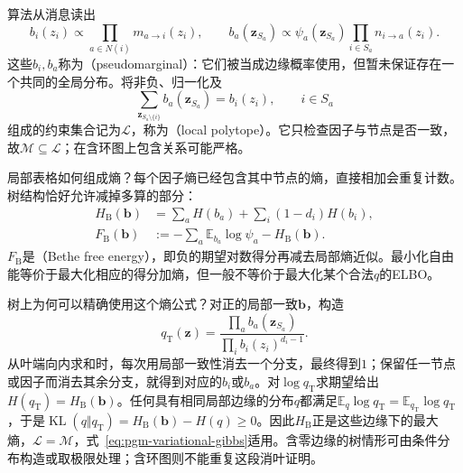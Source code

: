 算法从消息读出
\[
  b_i(z_i)\propto\prod_{a\in N(i)}m_{a\to i}(z_i),
  \qquad
  b_a(\bm z_{S_a})\propto\psi_a(\bm z_{S_a})
                         \prod_{i\in S_a}n_{i\to a}(z_i).
\]
这些$b_i,b_a$称为（pseudomarginal）：它们被当成边缘概率使用，但暂未保证存在一个共同的全局分布。将非负、归一化及
\begin{equation}
  \sum_{\bm z_{S_a\setminus\{i\}}}b_a(\bm z_{S_a})=b_i(z_i),
  \qquad i\in S_a
  \label{eq:pgm-variational-local-consistency}
\end{equation}
组成的约束集合记为$\mathcal L$，称为（local polytope）。它只检查因子与节点是否一致，故$\mathcal M\subseteq\mathcal L$；在含环图上包含关系可能严格。

局部表格如何组成熵？每个因子熵已经包含其中节点的熵，直接相加会重复计数。树结构恰好允许减掉多算的部分：
\begin{equation}
  \begin{aligned}
    H_{\mathrm B}(\bm b)
      &=\sum_aH(b_a)+\sum_i(1-d_i)H(b_i),\\
    F_{\mathrm B}(\bm b)
      &:=-\sum_a\mathbb E_{b_a}\log\psi_a-H_{\mathrm B}(\bm b).
  \end{aligned}
  \label{eq:pgm-variational-bethe}
\end{equation}
$F_{\mathrm B}$是（Bethe free energy），即负的期望对数得分再减去局部熵近似。最小化自由能等价于最大化相应的得分加熵，但一般不等价于最大化某个合法$q$的ELBO。

树上为何可以精确使用这个熵公式？对正的局部一致$\bm b$，构造
\[
  q_{\mathrm T}(\bm z)=
    \frac{\prod_a b_a(\bm z_{S_a})}
         {\prod_i b_i(z_i)^{d_i-1}}.
\]
从叶端向内求和时，每次用局部一致性消去一个分支，最终得到$1$；保留任一节点或因子而消去其余分支，就得到对应的$b_i$或$b_a$。对$\log q_{\mathrm T}$求期望给出$H(q_{\mathrm T})=H_{\mathrm B}(\bm b)$。任何具有相同局部边缘的分布$q$都满足$\mathbb E_q\log q_{\mathrm T}=\mathbb E_{q_{\mathrm T}}\log q_{\mathrm T}$，于是$\operatorname{KL}(q\Vert q_{\mathrm T})=H_{\mathrm B}(\bm b)-H(q)\geq0$。因此$H_{\mathrm B}$正是这些边缘下的最大熵，$\mathcal L=\mathcal M$，式~\eqref{eq:pgm-variational-gibbs}适用。含零边缘的树情形可由条件分布构造或取极限处理；含环图则不能重复这段消叶证明。

